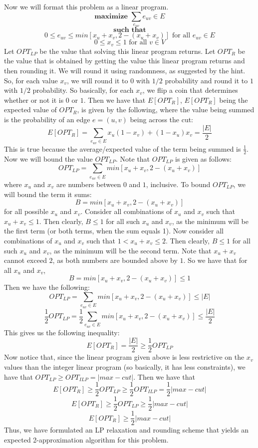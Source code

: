 \documentclass{article}
\begin{document}
Now we will format this problem as a linear program.
\[ \textbf{maximize } \sum_{e_{uv}} e_{uv} \in E \]
\[ \textbf{such that} \]
\[ 0 \leq e_{uv} \leq min[x_u + x_v, 2 - (x_u + x_v)] \text{ for all $e_{uv} \in E$} \]
\[ 0 \leq x_v \leq 1 \text{ for all $v \in V$} \]
Let $OPT_{LP}$ be the value that solving this linear program returns. Let
$OPT_R$ be the value that is obtained by getting the value this linear program
returns and then rounding it. We will round it using randomness, as suggested by
the hint. So, for each value $x_v$, we will round it to $0$ with $1/2$
probability and round it to $1$ with $1/2$ probability. So basically, for each
$x_v$, we flip a coin that determines whether or not it is $0$ or $1$. Then we
have that $E[OPT_R]$, $E[OPT_R]$ being the expected value of $OPT_R$, is given
by the following, where the value being summed is the probability of an edge $e
= (u,v)$ being across the cut:
\[ E[OPT_R] = \sum_{e_{uv} \in E} x_u(1 - x_v) + (1 - x_u)x_v = \frac{|E|}{2} \]
This is true because the average/expected value of the term being summed is
$\frac{1}{2}$.
Now we will bound the value $OPT_{LP}$. Note that $OPT_{LP}$ is given as
follows:
\[ OPT_{LP} = \sum_{e_{uv} \in E} min[x_u + x_v, 2 - (x_u + x_v)] \]
where $x_u$ and $x_v$ are numbers between $0$ and $1$, inclusive. To bound
$OPT_{LP}$, we will bound the term it sums:
\[ B = min[x_u + x_v, 2 - (x_u + x_v)] \]
for all possible $x_u$ and $x_v$. Consider all combinations of $x_u$ and $x_v$
such that $x_u + x_v \leq 1$. Then clearly, $B \leq 1$ for all such $x_u$ and
$x_v$, as the minimum will be the first term (or both terms, when the sum equals
1). Now consider all combinations of $x_u$ and $x_v$ such that $1 < x_u + x_v
\leq 2$. Then clearly, $B \leq 1$ for all such $x_u$ and $x_v$, as the minimum
will be the second term. Note that $x_u + x_v$ cannot exceed $2$, as both
numbers are bounded above by $1$. So we have that for all $x_u$ and $x_v$,
\[ B = min[x_u + x_v, 2 - (x_u + x_v)] \leq 1 \]
Then we have the following:
\[ OPT_{LP} = \sum_{e_{uv} \in E} min[x_u + x_v, 2 - (x_u + x_v)] \leq |E| \]
\[ \frac{1}{2} OPT_{LP} = \frac{1}{2} \sum_{e_{uv} \in E} min[x_u + x_v, 2 -
(x_u + x_v)] \leq \frac{|E|}{2} \]
This gives us the following inequality:
\[ E[OPT_R] = \frac{|E|}{2} \geq \frac{1}{2} OPT_{LP} \]
Now notice that, since the linear program given above is less restrictive on the
$x_v$ values than the integer linear program (so basically, it has less
constraints), we have that $OPT_{LP} \geq OPT_{ILP} = |max-cut|$. Then we have
that
\[ E[OPT_R] \geq \frac{1}{2} OPT_{LP} \geq \frac{1}{2} OPT_{ILP} = \frac{1}{2} |max-cut| \]
\[ E[OPT_R] \geq \frac{1}{2} OPT_{LP} \geq \frac{1}{2} |max-cut| \]
\[ E[OPT_R] \geq \frac{1}{2} |max-cut| \]
Thus, we have formulated an LP relaxation and rounding scheme that yields an
expected 2-approximation algorithm for this problem.
\newpage
\end{document}

